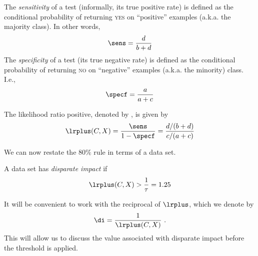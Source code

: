 \begin{defn}
  The \emph{sensitivity} of a test (informally, its true positive rate) is defined as the conditional probability of returning \textsc{yes} on ``positive'' examples (a.k.a. the majority class). In other words, 
\[ \sens = \frac{d}{b+d} \]
  The \emph{specificity} of a test (its true negative rate) is defined as the conditional probability of returning \textsc{no} on ``negative'' examples (a.k.a. the minority) class. I.e.,
\[ \specf = \frac{a}{a+c} \]
\end{defn}

\begin{defn}
The likelihood ratio positive, denoted by \lrplus, is given by 
\[ \lrplus(C, X) = \frac{\sens}{1 - \specf} = \frac{d/(b+d)}{c/(a+c)} \]
\end{defn}

We can now restate the $80\%$ rule in terms of a data set.
\begin{defn}[Disparate Impact]
A data set has \emph{disparate impact} if
\[ \lrplus(C, X) > \frac{1}{\tau} = 1.25 \]
\end{defn}

It will be convenient to work with the reciprocal of $\lrplus$, which we denote by 
\[ \di = \frac{1}{\lrplus(C, X)} \mbox{ .}\]
This will allow us to discuss the value associated with disparate impact before the threshold is applied.


